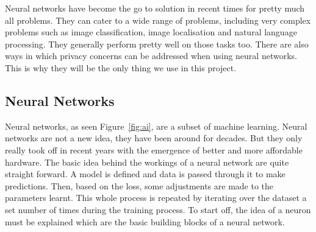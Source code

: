\documentclass[12pt]{article}
\begin{document}
\noindent Neural networks have become the go to solution in recent times for pretty much all problems. They can cater to a wide range of problems, including very complex problems such as image classification, image localisation and natural language processing. They generally perform pretty well on those tasks too. There are also ways in which privacy concerns can be addressed when using neural networks. This is why they will be the only thing we use in this project.  
\subsection{Neural Networks}\label{sec:neuralnets}
Neural networks, as seen Figure~\ref{fig:ai}, are a subset of machine learning. Neural networks are not a new idea, they have been around for decades. But they only really took off in recent years with the emergence of better and more affordable hardware. The basic idea behind the workings of a neural network are quite straight forward. A model is defined and data is passed through it to make predictions. Then, based on the loss, some adjustments are made to the parameters learnt. This whole process is repeated by iterating over the dataset a set number of times during the training process. To start off, the idea of a neuron must be explained which are the basic building blocks of a neural network.
\\\\
\end{document}
